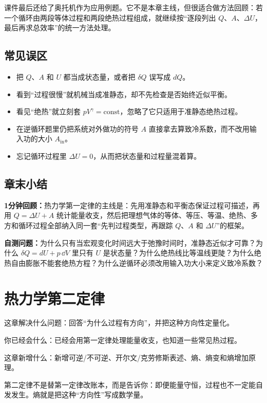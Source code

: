 \documentclass[lang=cn,11pt]{elegantbook}
\newcommand{\bridge}[1]{\begin{note}#1\end{note}}
\newcommand{\chapterroadmap}[3]{%
\begin{introduction}
  \item {\heiti 这章解决什么问题：}#1
  \item {\heiti 你已经会什么：}#2
  \item {\heiti 这章新增什么：}#3
\end{introduction}}
\newcommand{\summaryline}[1]{\par\noindent\textbf{1分钟回顾：}#1\par}
\newcommand{\chapterselfcheck}[1]{\par\noindent\textbf{自测问题：}#1\par}
\begin{document}
\begin{note}
课件最后还给了奥托机作为应用例题。它不是本章主线，但很适合做方法回顾：若一个循环由两段等体过程和两段绝热过程组成，就继续按“逐段列出 \(Q\)、\(A\)、\(\Delta U\)，最后再求总效率”的统一方法处理。
\end{note}

\section{常见误区}

\begin{itemize}
  \item 把 \(Q\)、\(A\) 和 \(U\) 都当成状态量，或者把 \(\delta Q\) 误写成 \(dQ\)。
  \item 看到“过程很慢”就机械当成准静态，却不先检查是否始终近似平衡。
  \item 看见“绝热”就立刻套 \(pV^\gamma=\text{const}\)，忽略了它只适用于准静态绝热过程。
  \item 在逆循环题里仍把系统对外做功的符号 \(A\) 直接拿去算致冷系数，而不改用输入功的大小 \(A_{\text{in}}\)。
  \item 忘记循环过程里 \(\Delta U=0\)，从而把状态量和过程量混着算。
\end{itemize}

\section{章末小结}

\summaryline{热力学第一定律的主线是：先用准静态和平衡态保证过程可描述，再用 \(Q=\Delta U+A\) 统计能量收支，然后把理想气体的等体、等压、等温、绝热、多方和循环过程全部纳入同一套“先判过程类型，再跟踪 \(Q\)、\(A\) 和 \(\Delta U\)”的框架。}
\chapterselfcheck{为什么只有当宏观变化时间远大于弛豫时间时，准静态近似才可靠？为什么 \(\delta Q=dU+p\,\dd V\) 里只有 \(U\) 是状态量？为什么绝热线比等温线更陡？为什么绝热自由膨胀不能套绝热方程？为什么逆循环必须改用输入功大小来定义致冷系数？}

\chapter{热力学第二定律}

\chapterroadmap
{回答“为什么过程有方向”，并把这种方向性定量化。}
{已经会用第一定律处理能量收支，也知道一些常见热过程。}
{新增可逆/不可逆、开尔文/克劳修斯表述、熵、熵变和熵增加原理。}

\bridge{第二定律不是替第一定律改账本，而是告诉你：即便能量守恒，过程也不一定能自发发生。熵就是把这种“方向性”写成数学量。}
\end{document}

